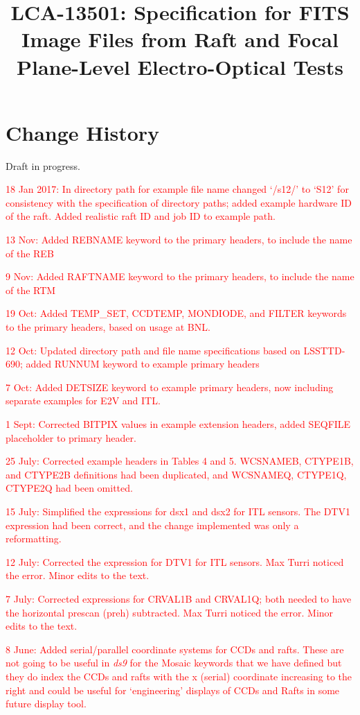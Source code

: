 \documentclass{article}[12pt]
\title{LCA-13501:  Specification for FITS Image Files from Raft and Focal Plane-Level Electro-Optical Tests}
\newcommand{\red}{\textcolor{red}}
\begin{document}
\maketitle
\tableofcontents
\newpage
\listoftables

\section{Change History}
Draft in progress. %

\red{18 Jan 2017:  In directory path for example file name changed `/s12/' to `S12' for consistency with the specification of directory paths; added example hardware ID of the raft.  Added realistic raft ID and job ID to example path.}

\red{13 Nov: Added REBNAME keyword to the primary headers, to include the name of the REB}

\red{9 Nov: Added RAFTNAME keyword to the primary headers, to include the name of the RTM}

\red{19 Oct:  Added TEMP\_SET, CCDTEMP, MONDIODE, and FILTER keywords to the primary headers, based on usage at BNL.}

\red{12 Oct:  Updated directory path and file name specifications based on LSSTTD-690; added RUNNUM keyword to example primary headers}

\red{7 Oct:  Added DETSIZE keyword to example primary headers, now including separate examples for E2V and ITL.}

\red{1 Sept: Corrected BITPIX values in example extension headers, added SEQFILE placeholder to primary header.}

\red{25 July: Corrected example headers in Tables 4 and 5.  WCSNAMEB, CTYPE1B, and CTYPE2B definitions had been duplicated, and WCSNAMEQ, CTYPE1Q, CTYPE2Q had been omitted.}

\red{15 July: Simplified the expressions for dsx1 and dsx2 for ITL sensors.  The DTV1 expression had been correct, and the change implemented was only a reformatting.}
  
\red{12 July:  Corrected the expression for DTV1 for ITL sensors.  Max Turri noticed the error.  Minor edits to the text.}

\red{7 July:  Corrected expressions for CRVAL1B and CRVAL1Q; both needed to have the horizontal prescan (preh) subtracted.  Max Turri noticed the error.  Minor edits to the text.}

\red{8 June:  Added serial/parallel coordinate systems for CCDs and rafts.  These are not going to be useful in {\it ds9} for the Mosaic keywords that we have defined but they do index the CCDs and rafts with the x (serial) coordinate increasing to the right and could be useful for `engineering' displays of CCDs and Rafts in some future display tool.}  
 
\end{document}

